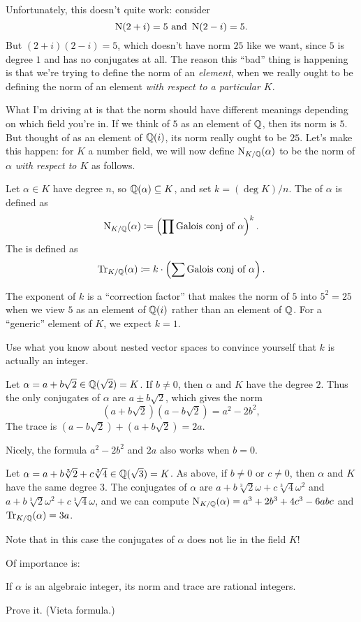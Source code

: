Unfortunately, this doesn't quite work: consider
\[ \operatorname{N}(2+i) = 5 \text{ and } \operatorname{N}(2-i) = 5. \]
But $(2+i)(2-i) = 5$, which doesn't have norm $25$ like we want,
since $5$ is degree $1$ and has no conjugates at all.
The reason this ``bad'' thing is happening is that we're
trying to define the norm of an \emph{element},
when we really ought to be defining the norm of an element
\emph{with respect to a particular $K$}.

What I'm driving at is that the norm should have
different meanings depending on which field you're in.
If we think of $5$ as an element of $\mathbb Q$, then its norm is $5$.
But thought of as an element of $\mathbb Q(i)$, its norm really ought to be $25$.
Let's make this happen: for $K$ a number field, we will now define $\operatorname{N}_{K/\mathbb Q}(\alpha)$
to be the norm of $\alpha$ \emph{with respect to $K$} as follows.
\begin{definition}
	Let $\alpha \in K$ have degree $n$, so $\mathbb Q(\alpha) \subseteq K$, and set $k = (\deg K) / n$.
	The  of $\alpha$ is defined as
	\[ \operatorname{N}_{K/\mathbb Q}(\alpha) \coloneqq \left( \prod \text{Galois conj of $\alpha$} \right)^k. \]
	The  is defined as
	\[ \operatorname{Tr}_{K/\mathbb Q}(\alpha) \coloneqq k \cdot \left( \sum \text{Galois conj of $\alpha$} \right). \]
\end{definition}
The exponent of $k$ is a ``correction factor'' that makes the norm of $5$ into $5^2=25$
when we view $5$ as an element of $\mathbb Q(i)$ rather than an element of $\mathbb Q$.
For a ``generic'' element of $K$, we expect $k = 1$.
\begin{exercise}
	Use what you know about nested vector spaces to convince
	yourself that $k$ is actually an integer.
\end{exercise}
\begin{example}
	Let $\alpha = a+b\sqrt2 \in \mathbb Q(\sqrt2) = K$.
	If $b \neq 0$, then $\alpha$ and $K$ have the degree $2$.
	Thus the only conjugates of $\alpha$ are $a \pm b\sqrt2$, which gives
	the norm \[ (a+b\sqrt2)(a-b\sqrt2) = a^2-2b^2, \]
	The trace is $(a-b\sqrt2) + (a+b\sqrt2) = 2a$.

	Nicely, the formula $a^2-2b^2$ and $2a$ also works when $b=0$.
\end{example}
\begin{example}
	Let $\alpha = a+b\sqrt[3] 2+c\sqrt[3] 4 \in \mathbb Q(\sqrt3) = K$.
	As above, if $b \neq 0$ or $c \neq 0$, then $\alpha$ and $K$ have the
	same degree $3$.
	The conjugates of $\alpha$ are $a+b\sqrt[3] 2 \omega+c\sqrt[3] 4 \omega^2$
	and $a+b\sqrt[3] 2 \omega^2+c\sqrt[3] 4 \omega$,
	and we can compute $\operatorname{N}_{K/\mathbb Q}(\alpha) = a^3 + 2b^3 + 4c^3 - 6abc$ and
	$\operatorname{Tr}_{K/\mathbb Q}(\alpha) = 3a$.

	Note that in this case the conjugates of $\alpha$ does not
	lie in the field $K$!
\end{example}
Of importance is:
\begin{proposition}
	If $\alpha$ is an algebraic integer, its norm and trace
	are rational integers.
\end{proposition}
\begin{ques}
	Prove it. (Vieta formula.)
\end{ques}

